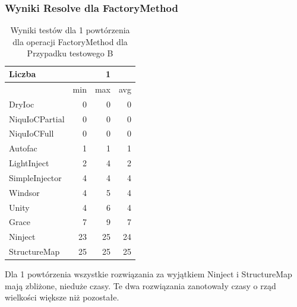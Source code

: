 \documentclass[12pt]{article}
\begin{document}
\subsubsection{Wyniki Resolve dla FactoryMethod}
\begin{table}[H]
\captionsetup{belowskip=0pt,aboveskip=0pt}
\begin{center}
\begin{small}
	\begin{tabular}{ | l | r r r | }
    		\hline
Liczba & & 1 & \\ \hline
 & min & max & avg \\ \hline
DryIoc & 0 & 0 & 0 \\ \hline
NiquIoCPartial & 0 & 0 & 0 \\ \hline
NiquIoCFull & 0 & 0 & 0 \\ \hline
Autofac & 1 & 1 & 1 \\ \hline
LightInject & 2 & 4 & 2 \\ \hline
SimpleInjector & 4 & 4 & 4 \\ \hline
Windsor & 4 & 5 & 4 \\ \hline
Unity & 4 & 6 & 4 \\ \hline
Grace & 7 & 9 & 7 \\ \hline
Ninject & 23 & 25 & 24 \\ \hline
StructureMap & 25 & 25 & 25 \\ \hline
  	\end{tabular}
\end{small}
\end{center}
\caption{Wyniki testów dla 1 powtórzenia dla operacji FactoryMethod dla Przypadku testowego B}
\label{TestCaseB_FactoryMethod1}
\end{table}
Dla 1 powtórzenia wszystkie rozwiązania za wyjątkiem Ninject i StructureMap mają zbliżone, nieduże czasy. Te dwa rozwiązania zanotowały czasy o rząd wielkości większe niż pozostałe.
\\
\end{document}
